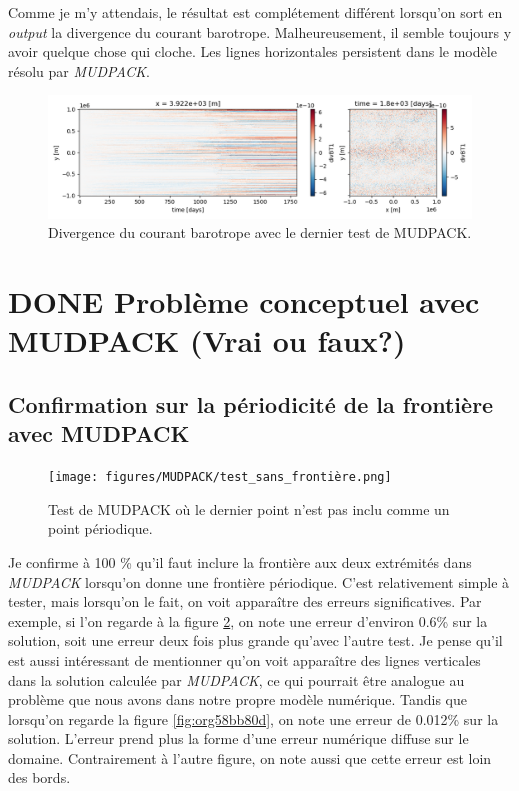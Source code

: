 \documentclass[10pt]{article}
\numberwithin{equation}{section}
\begin{document}
Comme je m'y attendais, le résultat est complétement différent lorsqu'on sort en \emph{output} la divergence du courant barotrope.
Malheureusement, il semble toujours y avoir quelque chose qui cloche.
Les lignes horizontales persistent dans le modèle résolu par \emph{MUDPACK}.

\begin{figure}[!htpb]
\centering
\includegraphics[width=.9\linewidth]{figures/debuggage/2023_07_03_comp_divBT.png}
\caption{\label{fig:orga94d459}Divergence du courant barotrope avec le dernier test de MUDPACK.}
\end{figure}
\section{{\bfseries\sffamily DONE} Problème conceptuel avec MUDPACK (Vrai ou faux?)}
\label{sec:orge9c0f70}

\subsection{Confirmation sur la périodicité de la frontière avec MUDPACK}
\label{sec:orgc18427e}

\begin{figure}[!htpb]
\centering
\texttt{[image: figures/MUDPACK/test\_sans\_frontière.png]}
\caption{\label{fig:org78400a9}Test de MUDPACK où le dernier point n'est pas inclu comme un point périodique.}
\end{figure}

Je confirme à 100 \% qu'il faut inclure la frontière aux deux extrémités dans \emph{MUDPACK} lorsqu'on donne une frontière périodique.
C'est relativement simple à tester, mais lorsqu'on le fait, on voit apparaître des erreurs significatives.
Par exemple, si l'on regarde à la figure \ref{fig:org78400a9}, on note une erreur d'environ 0.6\% sur la solution, soit une erreur deux fois plus grande qu'avec l'autre test.
Je pense qu'il est aussi intéressant de mentionner qu'on voit apparaître des lignes verticales dans la solution calculée par \emph{MUDPACK}, ce qui pourrait être analogue au problème que nous avons dans notre propre modèle numérique. 
Tandis que lorsqu'on regarde la figure \ref{fig:org58bb80d}, on note une erreur de 0.012\% sur la solution.
L'erreur prend plus la forme d'une erreur numérique diffuse sur le domaine.
Contrairement à l'autre figure, on note aussi que cette erreur est loin des bords. \bigskip
\end{document}
